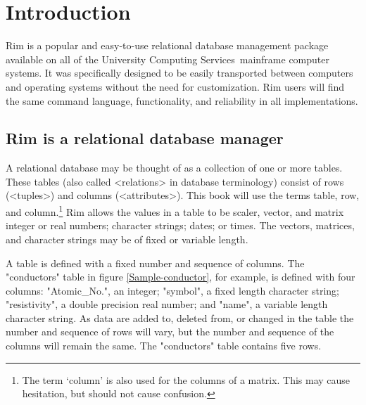 \documentclass[11pt,a4paper]{report}
\def\UCS{University Computing Services}
\def\I{\index}
\begin{document}
%
%
\chapter{Introduction}
 
Rim is a popular and easy-to-use
relational database management package available
on all of the \UCS\ mainframe computer systems.
It was specifically designed to be easily transported between
computers and operating systems without the need for
customization.  Rim users will find the same command language,
functionality, and reliability in all implementations.
 
 
\section{Rim is a relational database manager}
\I{relational database}
A relational database may be thought of as a collection of
one or more tables.  These tables (also called <relations> in
database terminology) consist of rows (<tuples>) and
columns (<attributes>).
This book will use the terms table,
row, and column.\footnote{The term `column' is also used for
the columns of a matrix.  This may cause hesitation, but
should not cause confusion.}
Rim allows the values in a table to be
scaler, vector, and matrix integer or real numbers;
character strings; dates; or times.
The vectors, matrices, and character strings may be of fixed
or variable length.
 
A table is defined with a fixed number and sequence
of columns.  The "conductors" table in
figure \ref{Sample-conductor}, for example,
is defined with four columns: "Atomic\_No.", an integer;
"symbol", a fixed length character string;
"resistivity", a double precision real number;
and "name", a variable length character string.
As data are added to, deleted from, or changed in the
table the number and sequence of rows will vary, but
the number and sequence of the columns will remain the same.
The "conductors" table contains five rows.
 
\end{document}
